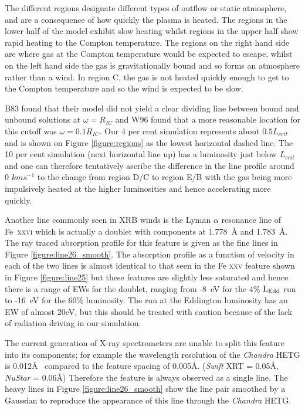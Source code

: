 \documentclass[a4paper,fleqn,usenatbib]{mnras}
\begin{document}
The different regions designate different types of outflow or static atmosphere, and are a consequence of
how quickly the plasma is heated. The regions in the lower half of the model exhibit slow heating 
whilst regions in the upper half show rapid heating to the Compton temperature. The regions on the
right hand side are where gas at the Compton temperature would be expected to escape, whilst on the 
left hand side the gas is gravitationally bound and so forms an atmosphere rather than a wind. 
In region C, the gas is not heated quickly enough to get to the Compton temperature and so the 
wind is expected to be slow.

B83 found that their model did not yield a clear dividing line between bound and unbound solutions 
at $\omega=R_{IC}$ and W96 found that a more reasonable location for this cutoff was $\omega=0.1 R_{IC}$.
Our 4 per cent simulation represents about $0.5 L_{crit}$ and is shown on Figure \ref{figure:regions} as the lowest 
horizontal dashed line. The 10 per cent simulation (next horizontal line up) has a luminosity just below $L_{crit}$ 
and one can therefore tentatively ascribe the difference in the line profile around 0 $kms^{-1}$ to the change from 
region D/C to region E/B with the gas being more impulsively heated at the higher luminosities and hence 
accelerating more quickly.

Another line commonly seen in XRB winds is the Lyman $\alpha$ resonance 
line of Fe~\textsc{xxvi} which is actually a doublet with components at
1.778~{\AA} and 1.783~{\AA}. The ray traced absorption profile for this 
feature is given as the fine lines in Figure \ref{figure:line26_smooth}. The absorption profile
as a function of velocity in each of the two lines is almost identical to that seen in the 
Fe \textsc{xxv} feature shown in Figure \ref{figure:line25} but these features
are slightly less
saturated and hence there is a range of EWs for the doublet, ranging from -8~eV for the 4\% $\rm{L_{Edd}}$
run to -16~eV for the 60\% luminosity. The run at the Eddington luminosity 
has an EW of almost 20eV, but this should be treated with caution because of the lack
of radiation driving in our simulation.

The current generation of X-ray spectrometers are unable to split this feature
into its components; for example the wavelength resolution of the \emph{Chandra}
HETG is 0.012\AA~ compared to the feature spacing of 0.005\AA. (\emph{Swift} XRT = 0.05\AA,
\emph{NuStar} = 0.06\AA)
 Therefore the feature is always observed as a single line. The heavy lines in Figure 
 \ref{figure:line26_smooth}
show the line pair smoothed by a Gaussian to reproduce the appearance of this line
through the \emph{Chandra} HETG. 
\end{document}
